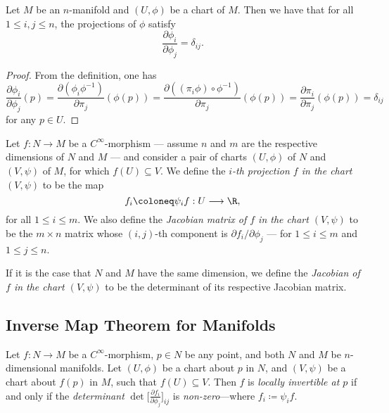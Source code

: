 \begin{proposition}
\label{prop:partial-derivative-distinct-projections}
Let \(M\) be an \(n\)-manifold and \((U, \phi)\) be a chart of \(M\). Then we
have that for all \(1 \leq i, j \leq n\), the projections of \(\phi\) satisfy
\[
\frac{\partial \phi_i}{\partial \phi_j} = \delta_{i j}.
\]
\end{proposition}

\begin{proof}
From the definition, one has
\[
\frac{\partial \phi_{i}}{\partial \phi_j} (p)
= \frac{\partial (\phi_{i} \phi^{-1})}{\partial \pi_j} (\phi(p))
= \frac{\partial ((\pi_i \phi) \circ \phi^{-1})}{\partial \pi_j} (\phi(p))
= \frac{\partial \pi_i}{\partial \pi_j} (\phi(p))
= \delta_{i j}
\]
for any \(p \in U\).
\end{proof}

\begin{definition}[Jacobian]
\label{def:}
Let \(f: N \to M\) be a \(C^{\infty}\)-morphism --- assume \(n\) and \(m\) are
the respective dimensions of \(N\) and \(M\) --- and consider a pair of charts
\((U, \phi)\) of \(N\) and \((V, \psi)\) of \(M\), for which
\(f(U) \subseteq V\). We define the \emph{\(i\)-th projection \(f\) in the chart
  \((V, \psi)\)} to be the map
\[
f_i \coloneq \psi_i f: U \longrightarrow \R,
\]
for all \(1 \leq i \leq m\).  We also define the \emph{Jacobian matrix of \(f\)
  in the chart \((V, \psi)\)} to be the \(m \times n\) matrix whose
\((i, j)\)-th component is \(\partial f_i/\partial \phi_j\) --- for
\(1 \leq i \leq m\) and \(1 \leq j \leq n\).

If it is the case that \(N\) and \(M\) have the same dimension, we define the
\emph{Jacobian of \(f\) in the chart \((V, \psi)\)} to be the determinant of its
respective Jacobian matrix.
\end{definition}

\subsection{Inverse Map Theorem for Manifolds}

\begin{theorem}
\label{thm:inverse-map-theorem-manifolds}
Let \(f: N \to M\) be a \(C^{\infty}\)-morphism, \(p \in N\) be any point, and
both \(N\) and \(M\) be \(n\)-dimensional manifolds. Let \((U, \phi)\) be a
chart about \(p\) in \(N\), and \((V, \psi)\) be a chart about \(f(p)\) in
\(M\), such that \(f(U) \subseteq V\). Then \(f\) is \emph{locally invertible at
  \(p\)} if and only if the \emph{determinant}
\(\det \big[\frac{\partial f_i}{\partial \phi_j}\big]_{ij}\) is
\emph{non-zero}---where \(f_i \coloneq \psi_i f\).
\end{theorem}

